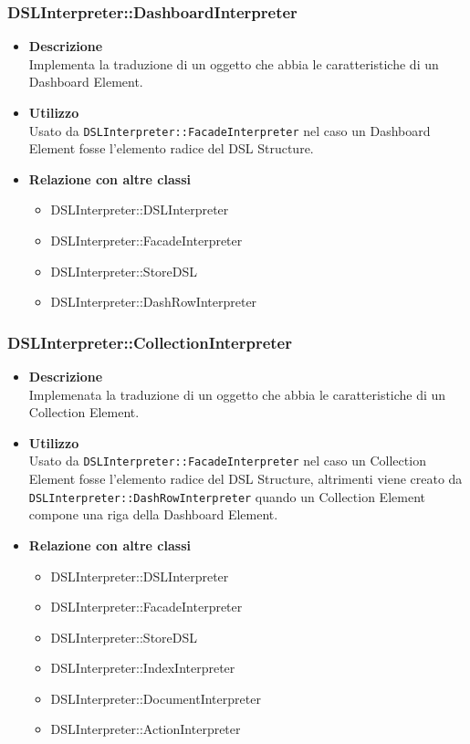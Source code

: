 \subsubsection{DSLInterpreter::DashboardInterpreter}
\begin{itemize}
\item \textbf{Descrizione} \hfill \\
Implementa la traduzione di un oggetto che abbia le caratteristiche di un Dashboard Element.
\item \textbf{Utilizzo} \hfill \\
Usato da \texttt{DSLInterpreter::FacadeInterpreter} nel caso un Dashboard Element fosse l'elemento radice del DSL Structure. 
\item \textbf{Relazione con altre classi}
\begin{itemize}
\item DSLInterpreter::DSLInterpreter
\item DSLInterpreter::FacadeInterpreter
\item DSLInterpreter::StoreDSL
\item DSLInterpreter::DashRowInterpreter
\end{itemize}
\end{itemize}

\subsubsection{DSLInterpreter::CollectionInterpreter}
\begin{itemize}
\item \textbf{Descrizione} \hfill \\
Implemenata la traduzione di un oggetto che abbia le caratteristiche di un Collection Element.
\item \textbf{Utilizzo} \hfill \\
Usato da \texttt{DSLInterpreter::FacadeInterpreter} nel caso un Collection Element fosse l'elemento radice del DSL Structure, altrimenti viene creato da \texttt{DSLInterpreter::DashRowInterpreter} quando un Collection Element compone una riga della Dashboard Element.
\item \textbf{Relazione con altre classi}
\begin{itemize}
\item DSLInterpreter::DSLInterpreter
\item DSLInterpreter::FacadeInterpreter
\item DSLInterpreter::StoreDSL
\item DSLInterpreter::IndexInterpreter
\item DSLInterpreter::DocumentInterpreter
\item DSLInterpreter::ActionInterpreter
\end{itemize}
\end{itemize}

